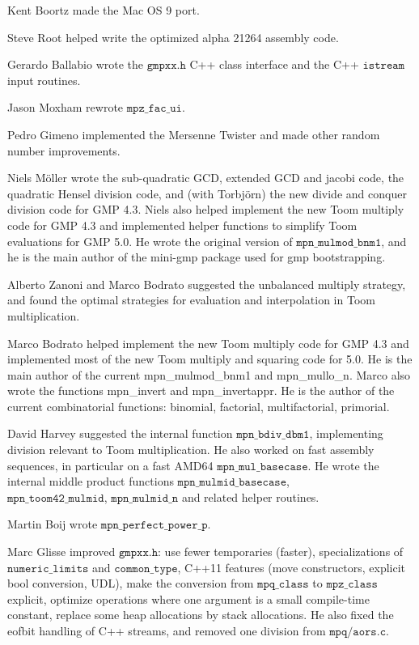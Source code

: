 \vpara
Kent Boortz made the Mac OS 9 port.

\vpara
Steve Root helped write the optimized alpha 21264 assembly code.

\vpara
Gerardo Ballabio wrote the $\mathtt{gmpxx.h}$ C++ class interface and the C++
$\mathtt{istream}$ input routines.

\vpara
Jason Moxham rewrote $\mathtt{mpz\_fac\_ui}$.

\vpara
Pedro Gimeno implemented the Mersenne Twister and made other random number
improvements.

\vpara
Niels M\"oller wrote the sub-quadratic GCD, extended GCD and jacobi code, the
quadratic Hensel division code, and (with Torbj\"orn) the new divide and
conquer division code for GMP 4.3.  Niels also helped implement the new Toom
multiply code for GMP 4.3 and implemented helper functions to simplify Toom
evaluations for GMP 5.0.  He wrote the original version of $\mathtt{mpn\_mulmod\_bnm1}$, and
he is the main author of the mini-gmp package used for gmp bootstrapping.

\vpara
Alberto Zanoni and Marco Bodrato suggested the unbalanced multiply strategy,
and found the optimal strategies for evaluation and interpolation in Toom
multiplication.

\vpara
Marco Bodrato helped implement the new Toom multiply code for GMP 4.3 and
implemented most of the new Toom multiply and squaring code for 5.0.
He is the main author of the current mpn\_mulmod\_bnm1 and mpn\_mullo\_n.  Marco
also wrote the functions mpn\_invert and mpn\_invertappr.  He is the author of
the current combinatorial functions: binomial, factorial, multifactorial,
primorial.

\vpara
David Harvey suggested the internal function $\mathtt{mpn\_bdiv\_dbm1}$, implementing
division relevant to Toom multiplication.  He also worked on fast assembly
sequences, in particular on a fast AMD64 $\mathtt{mpn\_mul\_basecase}$. He wrote
the internal middle product functions $\mathtt{mpn\_mulmid\_basecase}$, \\
$\mathtt{mpn\_toom42\_mulmid}$, $\mathtt{mpn\_mulmid\_n}$ and related helper routines.

\vpara
Martin Boij wrote $\mathtt{mpn\_perfect\_power\_p}$.

\vpara
Marc Glisse improved $\mathtt{gmpxx.h}$: use fewer temporaries (faster),
specializations of $\mathtt{numeric\_limits}$ and $\mathtt{common\_type}$, C++11
features (move constructors, explicit bool conversion, UDL), make the
conversion from $\mathtt{mpq\_class}$ to $\mathtt{mpz\_class}$ explicit, optimize
operations where one argument is a small compile-time constant, replace
some heap allocations by stack allocations.  He also fixed the eofbit
handling of C++ streams, and removed one division from $\mathtt{mpq/aors.c}$.

